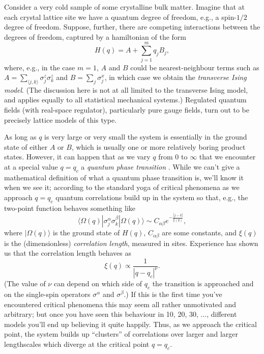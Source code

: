 \documentclass[11pt]{amsart}
\theoremstyle{plain}%
\theoremstyle{definition}
\theoremstyle{remark}
\begin{document}
Consider a very cold sample of some crystalline bulk matter. Imagine that at each crystal lattice site we have a quantum degree of freedom, e.g., a spin-$1/2$ degree of freedom. Suppose, further, there are competing interactions between the degrees of freedom, captured by a hamiltonian of the form
\begin{equation}\label{eq:latticemodel}
	H(q) = A + \sum_{j=1}^m q_j B_j,
\end{equation}
where, e.g., in the case $m=1$, $A$ and $B$ could be nearest-neighbour terms such as $A = \sum_{\langle j,k\rangle} \sigma^z_j\sigma_k^z$ and $B = \sum_{j} \sigma_j^x$, in which case we obtain the \emph{transverse Ising model}. (The discussion here is not at all limited to the transverse Ising model, and applies equally to all statistical mechanical systems.) Regulated quantum fields (with real-space regulator), particularly pure gauge fields, turn out to be precisely lattice models of this type. 

As long as $q$ is very large or very small the system is essentially in the ground state of either $A$ or $B$, which is usually one or more relatively boring product states. However, it can happen that as we vary $q$ from $0$ to $\infty$ that we encounter at a special value $q=q_c$ a \emph{quantum phase transition} \cite{sachdev_quantum_2011}. While we can't give a mathematical definition of what a quantum phase transition is, we'll know it when we see it; according to the standard yoga of critical phenomena as we approach $q=q_c$ quantum correlations build up in the system so that, e.g., the two-point function behaves something like
\begin{equation}\label{eq:correlator}
	\langle\Omega(q)| \sigma^\alpha_j\sigma^\beta_k|\Omega(q)\rangle \sim C_{\alpha\beta}e^{-\frac{|j-k|}{\xi(q)}},
\end{equation}
where $|\Omega(q)\rangle$ is the ground state of $H(q)$, $C_{\alpha\beta}$ are some constants, and $\xi(q)$ is the (dimensionless) \emph{correlation length}, measured in sites. Experience has shown us that the correlation length behaves as 
\begin{equation}
	\xi(q) \propto \frac{1}{|q-q_c|^\nu}.
\end{equation}
(The value of $\nu$ can depend on which side of $q_c$ the transition is approached and on the single-spin operators $\sigma^\alpha$ and $\sigma^\beta$.) If this is the first time you've encountered critical phenomena this may seem all rather unmotivated and arbitrary; but once you have seen this behaviour in 10, 20, 30, $\ldots$, different models you'll end up believing it quite happily.
Thus, as we approach the critical point, the system builds up ``clusters'' of correlations over larger and larger lengthscales which diverge at the critical point $q = q_c$. 
\end{document}
